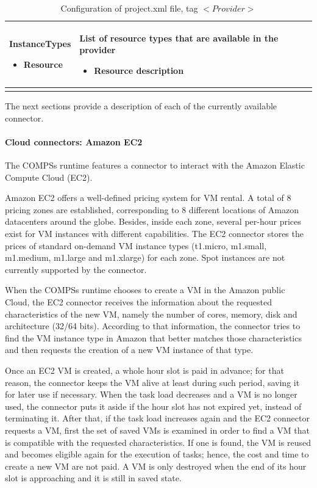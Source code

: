 \begin{longtable}{| p{} | p{} |}
  InstanceTypes \newline
  \begin{itemize}
  \item Resource
  \end{itemize}
  & 
  List of resource types that are available in the provider
  \begin{itemize}
  \item Resource description
  \end{itemize}
  \\
  \hline
  
  \caption{Configuration of project.xml file, tag $<Provider>$}
  \label{tab:conf_project_xml_provider}
\end{longtable}

The next sections provide a description of each of the currently available connector.

\newpage

\paragraph{Cloud connectors: Amazon EC2}
The COMPSs runtime features a connector to interact with the Amazon Elastic Compute Cloud (EC2).

Amazon EC2 offers a well-defined pricing system for VM rental. A total of 8 pricing zones are 
established, corresponding to 8 different locations of Amazon datacenters around the globe. 
Besides, inside each zone, several per-hour prices exist for VM instances with different capabilities. 
The EC2 connector stores the prices of standard on-demand VM instance types (t1.micro, m1.small, 
m1.medium, m1.large and m1.xlarge) for each zone. Spot instances are not currently supported by the connector.

When the COMPSs runtime chooses to create a VM in the Amazon public Cloud, the EC2 connector receives 
the information about the requested characteristics of the new VM, namely the number of cores, memory, 
disk and architecture (32/64 bits). According to that information, the connector tries to find the VM 
instance type in Amazon that better matches those characteristics and then requests the creation of a 
new VM instance of that type.

Once an EC2 VM is created, a whole hour slot is paid in advance; for that reason, the connector keeps 
the VM alive at least during such period, saving it for later use if necessary. When the task load 
decreases and a VM is no longer used, the connector puts it aside if the hour slot has not expired yet, 
instead of terminating it. After that, if the task load increases again and the EC2 connector requests 
a VM, first the set of saved VMs is examined in order to find a VM that is compatible with the requested 
characteristics. If one is found, the VM is reused and becomes eligible again for the execution of tasks; 
hence, the cost and time to create a new VM are not paid. A VM is only destroyed when the end of its hour 
slot is approaching and it is still in saved state.

